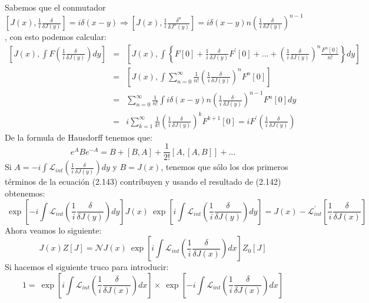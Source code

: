 Sabemos que el conmutador $\left[J(x),\frac{1}{i}\frac{\delta}{\delta J(y)}\right]=i\delta(x-y)\Rightarrow\left[J(x),\frac{1}{i}\frac{\delta^{n}}{\delta J^{n}(y)}\right]=i\delta(x-y)n\left(\frac{1}{i}\frac{\delta}{\delta J(y)}\right)^{n-1}$, con esto podemos calcular:
\begin{eqnarray}
\nonumber \left[J(x),\int F\left(\frac{1}{i}\frac{\delta}{\delta J(y)}\right)dy\right]&=&\left[J(x),\int\left\{ F[0]+\frac{1}{i}\frac{\delta}{\delta J(y)}F^{\prime}[0]+...+\left(\frac{1}{i}\frac{\delta}{\delta J(y)}\right)^{n}\frac{F^{n}[0]}{n!}\right\} dy\right]\\
\nonumber &=& \left[J(x),\int\sum_{n=0}^{\infty}\frac{1}{n!}\left(\frac{1}{i}\frac{\delta}{\delta J(y)}\right)^{n}F^{n}[0]\right]\\
\nonumber &=& \sum_{n=0}^{\infty}\frac{1}{n!}\int i\delta(x-y)n\left(\frac{1}{i}\frac{\delta}{\delta J(y)}\right)^{n-1}F^{n}[0]dy\\
&=& i\sum_{k=1}^{\infty}\frac{1}{k!}\left(\frac{1}{i}\frac{\delta}{\delta J(y)}\right)^{k}F^{k+1}[0]=iF^{\prime}\left(\frac{1}{i}\frac{\delta}{\delta J(y)}\right)
\end{eqnarray}
De la formula de Hausdorff tenemos que:
\begin{equation}
e^ABe^{-A}=B+[B,A]+\frac{1}{2!}[A,[A,B]]+...
\end{equation}
Si $A=-i\int\mathcal{L}_{int}\left(\frac{1}{i}\frac{\delta}{\delta J(y)}\right)dy$ y $B=J(x)$, tenemos que sólo los dos primeros términos de la ecuación (2.143) contribuyen y usando el resultado de (2.142) obtenemos:
\begin{equation}
\ \exp\left[-i\int\mathcal{L}_{int}\left(\frac{1}{i}\frac{\delta}{\delta J(y)}\right)dy\right]J(x)\ \exp\left[i\int\mathcal{L}_{int}\left(\frac{1}{i}\frac{\delta}{\delta J(y)}\right)dy\right]=J(x)-\mathcal{L}_{int}^{\prime}\left[\frac{1}{i}\frac{\delta}{\delta J(x)}\right]
\end{equation}
Ahora veamos lo siguiente:
\begin{equation}
J(x)Z[J]=\mathcal{N}J(x)\ \exp\left[i\int\mathcal{L}_{int}\left(\frac{1}{i}\frac{\delta}{\delta J(x)}\right)dx\right]Z_{0}[J]
\end{equation}
Si hacemos el siguiente truco para introducir:
\begin{equation}
1=\ \exp\left[i\int\mathcal{L}_{int}\left(\frac{1}{i}\frac{\delta}{\delta J(x)}\right)dx\right]\times\ \exp\left[-i\int\mathcal{L}_{int}\left(\frac{1}{i}\frac{\delta}{\delta J(x)}\right)dx\right]
\end{equation}
